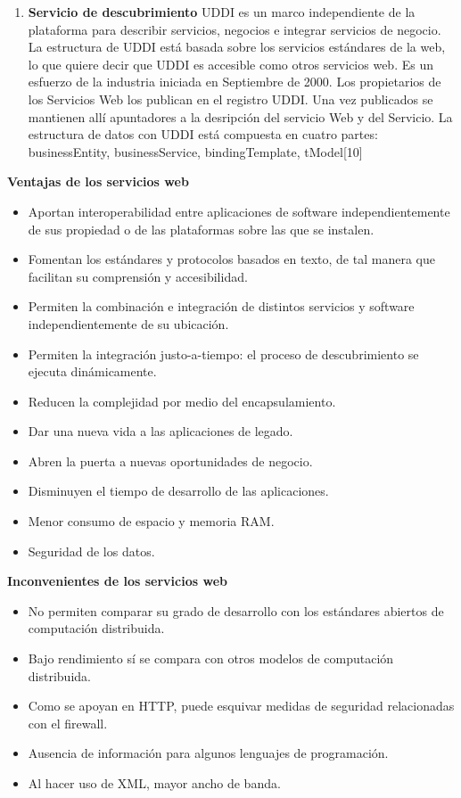 \begin{enumerate}
		\item \textbf{Servicio de descubrimiento}
		UDDI es un marco independiente de la plataforma para describir servicios, negocios e integrar servicios de negocio. La estructura de UDDI está basada sobre los servicios estándares de la web, lo que quiere decir que UDDI es accesible como otros servicios web.
		Es un esfuerzo de la industria iniciada en Septiembre de 2000. Los propietarios de los Servicios Web los publican en el registro UDDI. Una vez publicados se mantienen allí apuntadores a la desripción del servicio Web y del Servicio. La estructura de datos con UDDI está compuesta en cuatro partes: businessEntity, businessService, bindingTemplate, tModel[10]
	\end{enumerate}
	
	
	\textbf{Ventajas de los servicios web}
	
	\begin{itemize}
		\item Aportan interoperabilidad entre aplicaciones de software independientemente de sus propiedad o de las plataformas sobre las que se instalen.
		\item Fomentan los estándares y protocolos basados en texto, de tal manera que facilitan su comprensión y accesibilidad. 
		\item Permiten la combinación e integración de distintos servicios y software independientemente de su ubicación.
		\item Permiten la integración justo-a-tiempo: el proceso de descubrimiento se ejecuta dinámicamente.
		\item Reducen la complejidad por medio del encapsulamiento.
		\item Dar una nueva vida a las aplicaciones de legado.
		\item Abren la puerta a nuevas oportunidades de negocio.
		\item Disminuyen el tiempo de desarrollo de las aplicaciones.
		\item Menor consumo de espacio y memoria RAM.
		\item Seguridad de los datos.
	\end{itemize}
	
	\textbf{Inconvenientes de los servicios web}
	
	\begin{itemize}
		\item No permiten comparar su grado de desarrollo con los estándares abiertos de computación distribuida.
		\item Bajo rendimiento sí se compara con otros modelos de computación distribuida.
		\item Como se apoyan en HTTP, puede esquivar medidas de seguridad relacionadas con el firewall.
		\item Ausencia de información para algunos lenguajes de programación.
		\item Al hacer uso de XML, mayor ancho de banda.
	\end{itemize}
